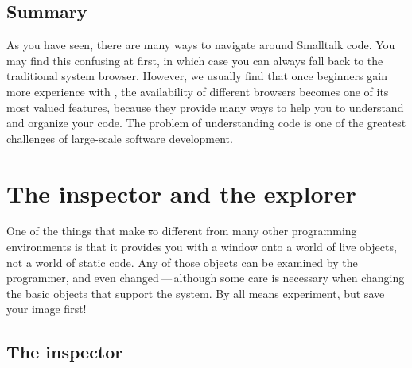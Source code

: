 \documentclass[a4paper,10pt,twoside]{book}
\begin{document}

\subsection{Summary}

As you have seen, there are many ways to navigate around Smalltalk code.
You may find this confusing at first, in which case you can always fall back to the traditional system browser.
However, we usually find that once beginners gain more experience with \sq, the availability of different browsers becomes one of its most valued features, because they provide many ways to help you to understand and organize your code.
The problem of understanding code is one of the greatest challenges of large-scale software development.

\section{The inspector and the explorer}
\label{sec:inspector} %

One of the things that make \st so different from many other programming environments is that it provides you with a window onto a world of live objects, not a world of static code.
Any of those objects can be examined by the programmer, and even changed\,---\,although some care is necessary when changing the basic objects that support the system.
By all means experiment, but save your image first!

\subsection{The inspector}

\end{document}
